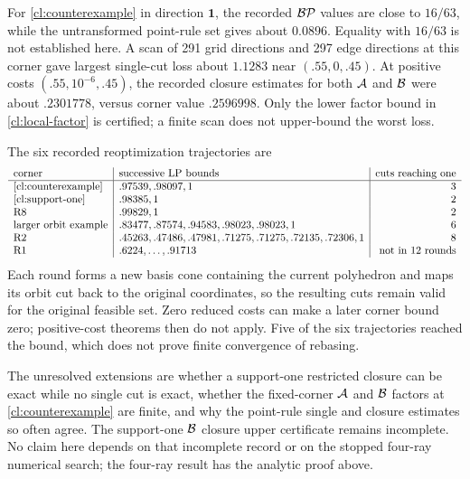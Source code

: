 For \cref{cl:counterexample} in direction $\mathbf1$, the recorded $\mathcal {BP}$ values are
close to $16/63$, while the untransformed point-rule set gives about
$0.0896$. Equality with $16/63$ is not established here.
A scan of 291 grid directions and 297 edge directions at this corner
gave largest single-cut loss about $1.1283$ near $(.55,0,.45)$.
At positive costs $(.55,10^{-6},.45)$, the recorded closure estimates for
both $\mathcal A$ and $\mathcal B$ were about $.2301778$, versus corner value
$.2596998$. Only the lower factor bound in \cref{cl:local-factor} is
certified; a finite scan does not upper-bound the worst loss.

The six recorded reoptimization trajectories are
\[
\begin{array}{l|l|r}
 \text{corner}&\text{successive LP bounds}&\text{cuts reaching one}\\\hline
 \text{\Cref{cl:counterexample}}&.97539,.98097,1&3\\
 \text{\Cref{cl:support-one}}&.98385,1&2\\
 \text{R8}&.99829,1&2\\
 \text{larger orbit example}&.83477,.87574,.94583,.98023,.98023,1&6\\
 \text{R2}&.45263,.47486,.47981,.71275,.71275,.72135,.72306,1&8\\
 \text{R1}&.6224,\ldots,.91713&\text{not in 12 rounds}
\end{array}
\]
Each round forms a new basis cone containing the current polyhedron and
maps its orbit cut back to the original coordinates, so the resulting
cuts remain valid for the original feasible set. Zero reduced costs can
make a later corner bound zero; positive-cost theorems then do not
apply. Five of the six trajectories reached the bound, which does not
prove finite convergence of rebasing.

The unresolved extensions are whether a support-one restricted closure
can be exact while no single cut is exact, whether the fixed-corner
$\mathcal A$ and $\mathcal B$ factors at \cref{cl:counterexample} are finite, and why the point-rule
single and closure estimates so often agree. The support-one $\mathcal B$
closure upper certificate remains incomplete. No claim here depends on
that incomplete record or on the stopped four-ray numerical search;
the four-ray result has the analytic proof above.
